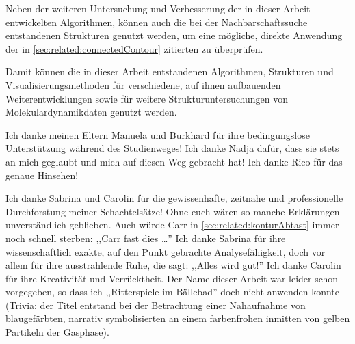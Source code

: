 Neben der weiteren Untersuchung und Verbesserung der in dieser Arbeit entwickelten Algorithmen, können auch die bei der Nachbarschaftssuche entstandenen Strukturen genutzt werden, um eine mögliche, direkte Anwendung der in \autoref{sec:related:connectedContour} zitierten  zu überprüfen.

Damit können die in dieser Arbeit entstandenen Algorithmen, Strukturen und Visualisierungsmethoden für verschiedene, auf ihnen aufbauenden Weiterentwicklungen sowie für weitere Strukturuntersuchungen von Molekulardynamikdaten genutzt werden.




Ich danke meinen Eltern Manuela und Burkhard für ihre bedingungslose Unterstützung während des Studienweges! Ich danke Nadja dafür, dass sie stets an mich geglaubt und mich auf diesen Weg gebracht hat! Ich danke Rico für das genaue Hinsehen!

Ich danke Sabrina und Carolin für die gewissenhafte, zeitnahe und professionelle Durchforstung meiner Schachtelsätze! Ohne euch wären so manche Erklärungen unverständlich geblieben. Auch würde Carr in \autoref{sec:related:konturAbtast} immer noch schnell sterben: ,,Carr fast dies \ldots'' Ich danke Sabrina für ihre wissenschaftlich exakte, auf den Punkt gebrachte Analysefähigkeit, doch vor allem für ihre ausstrahlende Ruhe, die sagt: ,,Alles wird gut!'' Ich danke Carolin für ihre Kreativität und Verrücktheit. Der Name dieser Arbeit war leider schon vorgegeben, so dass ich ,,Ritterspiele im Bällebad'' doch nicht anwenden konnte (Trivia: der Titel entstand bei der Betrachtung einer Nahaufnahme von blaugefärbten, narrativ symbolisierten  an einem farbenfrohen  inmitten von gelben Partikeln der Gasphase).

